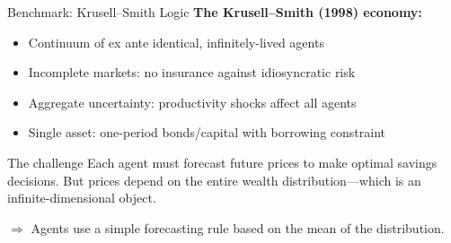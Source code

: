 \documentclass[aspectratio=169,11pt]{beamer}
\newcommand{\emphc}[1]{\textcolor{harvardcrimson}{#1}}
\begin{document}
\begin{frame}{Benchmark: Krusell--Smith Logic}
\textbf{The Krusell--Smith (1998) economy:}

\vspace{0.5em}
\begin{itemize}
    \item \emphc{Continuum} of ex ante identical, infinitely-lived agents
    \item \emphc{Incomplete markets}: no insurance against idiosyncratic risk
    \item \emphc{Aggregate uncertainty}: productivity shocks affect all agents
    \item \emphc{Single asset}: one-period bonds/capital with borrowing constraint
\end{itemize}

\vspace{0.5em}
\begin{block}{The challenge}
Each agent must forecast future prices to make optimal savings decisions. But prices depend on the \emphc{entire wealth distribution}---which is an infinite-dimensional object.
\end{block}

\vspace{0.3em}
$\Rightarrow$ Agents use a simple forecasting rule based on the \emphc{mean} of the distribution.
\end{frame}
\end{document}

